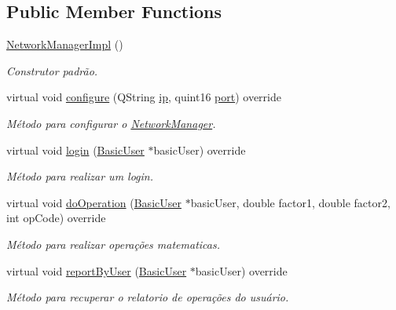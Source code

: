 \subsection*{Public Member Functions}
\begin{DoxyCompactItemize}
\item 
\hyperlink{classNetworkManagerImpl_ada113469ada30f72d3c36fac3f7ea4f2}{Network\+Manager\+Impl} ()\hypertarget{classNetworkManagerImpl_ada113469ada30f72d3c36fac3f7ea4f2}{}\label{classNetworkManagerImpl_ada113469ada30f72d3c36fac3f7ea4f2}

\begin{DoxyCompactList}\small\item\em Construtor padrão. \end{DoxyCompactList}\item 
virtual void \hyperlink{classNetworkManagerImpl_a4ad2bada544bc02ea1f9921f3f6f62c2}{configure} (Q\+String \hyperlink{classNetworkManagerImpl_ac5d5c68c8000d8afef7632259e19f788}{ip}, quint16 \hyperlink{classNetworkManagerImpl_a4723f928e10d6d90987ff673b36c434d}{port}) override
\begin{DoxyCompactList}\small\item\em Método para configurar o \hyperlink{classNetworkManager}{Network\+Manager}. \end{DoxyCompactList}\item 
virtual void \hyperlink{classNetworkManagerImpl_a59dfa1a94c491fadbd62197a36c806b6}{login} (\hyperlink{classBasicUser}{Basic\+User} $\ast$basic\+User) override
\begin{DoxyCompactList}\small\item\em Método para realizar um login. \end{DoxyCompactList}\item 
virtual void \hyperlink{classNetworkManagerImpl_a890d3968345656de525f042dbc281507}{do\+Operation} (\hyperlink{classBasicUser}{Basic\+User} $\ast$basic\+User, double factor1, double factor2, int op\+Code) override
\begin{DoxyCompactList}\small\item\em Método para realizar operações matematicas. \end{DoxyCompactList}\item 
virtual void \hyperlink{classNetworkManagerImpl_afa21ec0a3c38b1b1a48e5c58249c6374}{report\+By\+User} (\hyperlink{classBasicUser}{Basic\+User} $\ast$basic\+User) override
\begin{DoxyCompactList}\small\item\em Método para recuperar o relatorio de operações do usuário. \end{DoxyCompactList}\item 

\end{DoxyCompactItemize}

